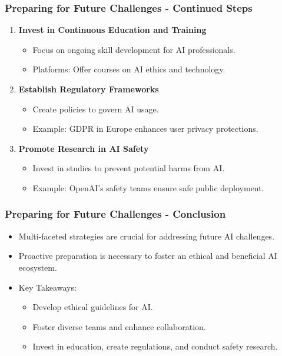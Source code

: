 \documentclass[aspectratio=169]{beamer}
\begin{document}
\begin{frame}[fragile]
    \frametitle{Preparing for Future Challenges - Continued Steps}
    \begin{enumerate}[resume]
        \item \textbf{Invest in Continuous Education and Training}
            \begin{itemize}
                \item Focus on ongoing skill development for AI professionals.
                \item Platforms: Offer courses on AI ethics and technology.
            \end{itemize}
        
        \item \textbf{Establish Regulatory Frameworks}
            \begin{itemize}
                \item Create policies to govern AI usage.
                \item Example: GDPR in Europe enhances user privacy protections.
            \end{itemize}
        
        \item \textbf{Promote Research in AI Safety}
            \begin{itemize}
                \item Invest in studies to prevent potential harms from AI.
                \item Example: OpenAI's safety teams ensure safe public deployment.
            \end{itemize}
    \end{enumerate}
\end{frame}

\begin{frame}[fragile]
    \frametitle{Preparing for Future Challenges - Conclusion}
    \begin{itemize}
        \item Multi-faceted strategies are crucial for addressing future AI challenges.
        \item Proactive preparation is necessary to foster an ethical and beneficial AI ecosystem.
        \item Key Takeaways:
            \begin{itemize}
                \item Develop ethical guidelines for AI.
                \item Foster diverse teams and enhance collaboration.
                \item Invest in education, create regulations, and conduct safety research.
            \end{itemize}
    \end{itemize}
\end{frame}
\end{document}
